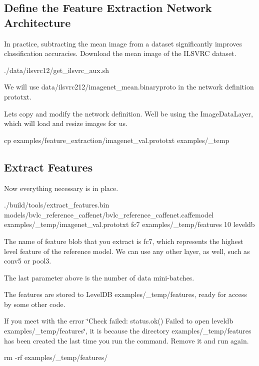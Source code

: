 \subsection*{Define the Feature Extraction Network Architecture }

In practice, subtracting the mean image from a dataset significantly improves classification accuracies. Download the mean image of the I\+L\+S\+V\+RC dataset. \begin{DoxyVerb}./data/ilsvrc12/get_ilsvrc_aux.sh
\end{DoxyVerb}


We will use {\ttfamily data/ilsvrc212/imagenet\+\_\+mean.\+binaryproto} in the network definition prototxt.

Let\textquotesingle{}s copy and modify the network definition. We\textquotesingle{}ll be using the {\ttfamily Image\+Data\+Layer}, which will load and resize images for us. \begin{DoxyVerb}cp examples/feature_extraction/imagenet_val.prototxt examples/_temp
\end{DoxyVerb}


\subsection*{Extract Features }

Now everything necessary is in place. \begin{DoxyVerb}./build/tools/extract_features.bin models/bvlc_reference_caffenet/bvlc_reference_caffenet.caffemodel examples/_temp/imagenet_val.prototxt fc7 examples/_temp/features 10 leveldb
\end{DoxyVerb}


The name of feature blob that you extract is {\ttfamily fc7}, which represents the highest level feature of the reference model. We can use any other layer, as well, such as {\ttfamily conv5} or {\ttfamily pool3}.

The last parameter above is the number of data mini-\/batches.

The features are stored to Level\+DB {\ttfamily examples/\+\_\+temp/features}, ready for access by some other code.

If you meet with the error \char`\"{}\+Check failed\+: status.\+ok() Failed to open leveldb examples/\+\_\+temp/features\char`\"{}, it is because the directory examples/\+\_\+temp/features has been created the last time you run the command. Remove it and run again. \begin{DoxyVerb}rm -rf examples/_temp/features/
\end{DoxyVerb}


